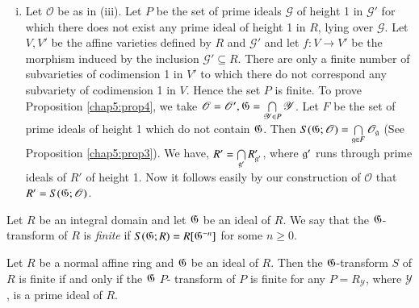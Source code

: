 \begin{enumerate}[(i)]
\item Let $\mathscr{O}$ be as in (iii). Let $P$ be the set of prime
 ideals $\mathscr{G}$ of height 1 in $\mathscr{G}'$ for which there
 does not exist any prime ideal of height 1 in $R$, lying over
 $\mathcal{G} $. Let $V, V'$ be the  affine varieties defined by $R$
 and $\mathscr{G}'$ and let $f:V \to V'$ be the morphism induced by
 the inclusion  
 $\mathscr{G}' \subseteq R $. There are only a finite number of
 subvarieties of codimension 1 in $V'$ to which there do not
 correspond any subvariety of codimension 1 in $V$. Hence the set
 $P$  is finite. To prove Proposition \ref{chap5:prop4}, we take $\mathscr{O} =
 \mathscr{O}', \mathfrak{G} = \bigcap\limits_{\mathscr{Y} \in P}
 \mathscr{Y}$. Let $F$ be the set of prime  ideals of height 1 which
 do not contain $\mathfrak{G}$. Then $S(\mathfrak{G};\mathscr{O}) =
 \bigcap\limits_{\mathfrak{g} \in  F }  \mathscr{O}_{\mathfrak{g}}$
 (See  Proposition \ref{chap5:prop3}). We have, $R' = \bigcap\limits_{\mathfrak{g}'}
 R' _{\mathfrak{g}'}$, where $\mathfrak{g}'$ runs through prime ideals
 of  $R'$  of height 1. Now  it  follows easily by our construction
 of $\mathscr{O}$ that $R' =  S (\mathfrak{G};\mathscr{O})$. 
\end{enumerate}
 
Let $R$ be an  integral domain and let  $\mathfrak{G}$ be an ideal of
 $R$. We  say that the  $\mathfrak{G}$-transform of $R$ is 
 \textit{finite} if $S(\mathfrak{G}; R ) = R [\mathfrak{G}^{-n}]$ for some 
 $n \ge 0 $.  
 
\setcounter{thm}{0}
\begin{thm}\label{chap5:thm1}%
  Let $R$ be a normal  affine ring and $\mathfrak{G}$ be  an  ideal of
  $R$. Then the $\mathfrak{G}$-transform $S$ of $R$  is finite if  and  only
  if the  $\mathfrak{G}$ $P$- transform of $P$ is finite for  any $P =
  R_{\mathscr{Y}}$, where $\mathscr{Y}$, is a prime ideal of $R$.  
 \end{thm} 
 
